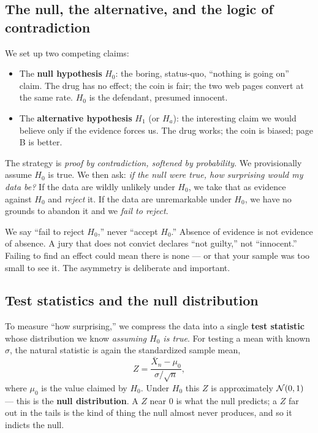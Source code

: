 \subsection{The null, the alternative, and the logic of contradiction}

We set up two competing claims:

\begin{itemize}
  \item The \textbf{null hypothesis} $H_0$: the boring, status-quo, ``nothing is going
  on'' claim. The drug has no effect; the coin is fair; the two web pages convert at the
  same rate. $H_0$ is the defendant, presumed innocent.
  \item The \textbf{alternative hypothesis} $H_1$ (or $H_a$): the interesting claim we
  would believe only if the evidence forces us. The drug works; the coin is biased; page
  B is better.
\end{itemize}

The strategy is \emph{proof by contradiction, softened by probability}. We provisionally
assume $H_0$ is true. We then ask: \emph{if the null were true, how surprising would my
data be?} If the data are wildly unlikely under $H_0$, we take that as evidence against
$H_0$ and \emph{reject} it. If the data are unremarkable under $H_0$, we have no grounds
to abandon it and we \emph{fail to reject}.

\begin{trapbox}
We say ``fail to reject $H_0$,'' never ``accept $H_0$.'' Absence of evidence is not
evidence of absence. A jury that does not convict declares ``not guilty,'' not
``innocent.'' Failing to find an effect could mean there is none --- or that your sample
was too small to see it. The asymmetry is deliberate and important.
\end{trapbox}

\subsection{Test statistics and the null distribution}

To measure ``how surprising,'' we compress the data into a single \textbf{test
statistic} whose distribution we know \emph{assuming $H_0$ is true}. For testing a mean
with known $\sigma$, the natural statistic is again the standardized sample mean,
\[
  Z = \frac{\bar X_n - \mu_0}{\sigma/\sqrt n},
\]
where $\mu_0$ is the value claimed by $H_0$. Under $H_0$ this $Z$ is approximately
$\mathcal{N}(0,1)$ --- this is the \textbf{null distribution}. A $Z$ near $0$ is what the
null predicts; a $Z$ far out in the tails is the kind of thing the null almost never
produces, and so it indicts the null.

